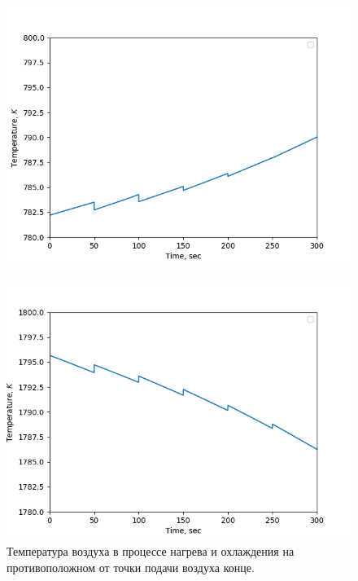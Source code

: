 \documentclass[a4paper,11pt,numreferences,mathsec,kaplist]{isuepsutf8}
\begin{document}
\begin{article}
\begin{figure}[ht]
    \centering
    \begin{minipage}[t]{0.49\textwidth}
        \centering
        \includegraphics[width=\textwidth]{img1}
        \label{fig:img1}
    \end{minipage}
    \hfill
    \begin{minipage}[t]{0.49\textwidth}
        \centering
        \includegraphics[width=\textwidth]{img2}
    \end{minipage}
    \caption {Температура воздуха в процессе нагрева и охлаждения на
    противоположном от точки подачи воздуха конце.}
\end{figure}


\end{article}
\end{document}
